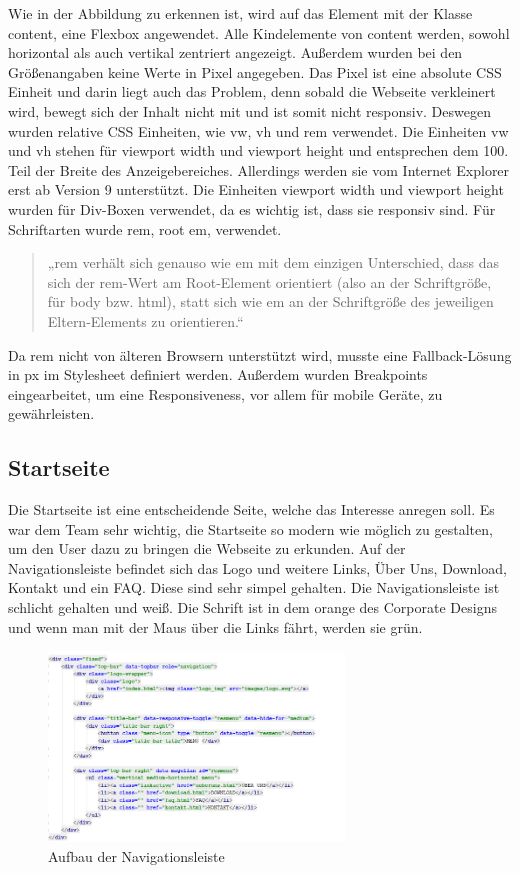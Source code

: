 Wie in der Abbildung zu erkennen ist, wird auf das Element mit der Klasse content, eine Flexbox angewendet. Alle Kindelemente von content werden, sowohl horizontal als auch vertikal zentriert angezeigt. Außerdem wurden bei den Größenangaben keine Werte in Pixel angegeben. Das Pixel ist eine absolute CSS Einheit und darin liegt auch das Problem, denn sobald die Webseite verkleinert wird, bewegt sich der Inhalt nicht mit und ist somit nicht responsiv. Deswegen wurden relative CSS Einheiten, wie vw, vh und rem verwendet. Die Einheiten vw und vh stehen für viewport width und viewport height und entsprechen dem 100. Teil der Breite des Anzeigebereiches. Allerdings werden sie vom Internet Explorer erst ab Version 9 unterstützt. Die Einheiten viewport width und viewport height wurden für Div-Boxen verwendet, da es wichtig ist, dass sie responsiv sind.  Für Schriftarten wurde rem, root em, verwendet. 

\begin{quote}
„rem verhält sich genauso wie em mit dem einzigen Unterschied, dass das sich der rem-Wert am Root-Element orientiert (also an der Schriftgröße, für body bzw. html), statt sich wie em an der Schriftgröße des jeweiligen Eltern-Elements zu orientieren.“
\end{quote}

Da rem nicht von älteren Browsern unterstützt wird, musste eine Fallback-Lösung in px im Stylesheet definiert werden.   Außerdem wurden Breakpoints eingearbeitet, um eine Responsiveness, vor allem für mobile Geräte, zu gewährleisten. 

\subsection{Startseite}
Die Startseite ist eine entscheidende Seite, welche das Interesse anregen soll. Es war dem Team sehr wichtig, die Startseite so modern wie möglich zu gestalten, um den User dazu zu bringen die Webseite zu erkunden. Auf der Navigationsleiste befindet sich das Logo und weitere Links, Über Uns, Download, Kontakt und ein FAQ. Diese sind sehr simpel gehalten. Die Navigationsleiste ist schlicht gehalten und weiß. Die Schrift ist in dem orange des Corporate Designs und wenn man mit der Maus über die Links fährt, werden sie grün. 

\begin{figure}[H] 
  \centering
     \includegraphics[width=0.7\textwidth]{webseite_abb3.png}
  \caption{Aufbau der Navigationsleiste}

\end{figure}

